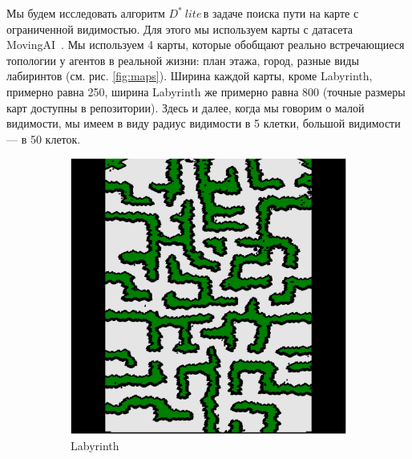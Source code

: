 \documentclass[11pt]{article}
\newcommand{\dstarlite}{\(D^*\ lite\)\,}
\begin{document}
    Мы будем исследовать алгоритм \dstarlite в задаче поиска пути на карте с ограниченной видимостью.
    Для этого мы используем карты с датасета MovingAI~\cite{sturtevant2012benchmarks}.
    Мы используем 4 карты, которые обобщают реально встречающиеся топологии у агентов в реальной жизни: план этажа, город, разные виды лабиринтов (см. рис.  \ref{fig:maps}).
    Ширина каждой карты, кроме Labyrinth, примерно равна 250, ширина Labyrinth же примерно равна 800 (точные размеры карт доступны в репозитории).
    Здесь и далее, когда мы говорим о малой видимости, мы имеем в виду радиус видимости в 5 клетки, большой видимости --- в 50 клеток.
    \begin{figure}
        \centering
        \begin{subfigure}[b]{0.24\textwidth}
            \centering
            \includegraphics[width=\textwidth]{../maps/Labyrinth}
            \caption{Labyrinth}
            \label{fig:y equals x}
        \end{subfigure}
        \hfill
        \begin{subfigure}[b]{0.24\textwidth}
            \centering

\end{subfigure}
\end{figure}
\end{document}
